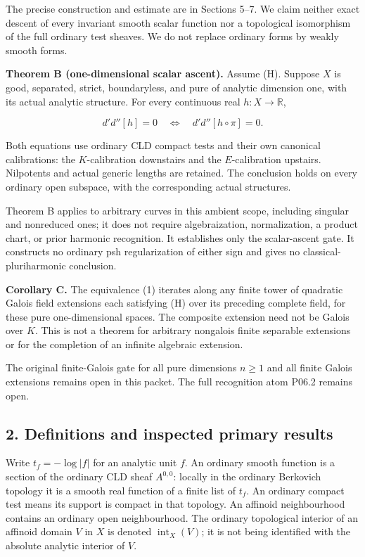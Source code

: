 \documentclass[
  11pt,
]{article}
\begin{document}
The precise construction and estimate are in Sections 5--7. We claim
neither exact descent of every invariant smooth scalar function nor a
topological isomorphism of the full ordinary test sheaves. We do not
replace ordinary forms by weakly smooth forms.

\textbf{Theorem B (one-dimensional scalar ascent).} Assume (H). Suppose
\(X\) is good, separated, strict, boundaryless, and pure of analytic
dimension one, with its actual analytic structure. For every continuous
real \(h:X\to\mathbb R\),

\[
d'd''[h]=0\quad\Longleftrightarrow\quad d'd''[h\circ\pi]=0. \tag{1}
\]

Both equations use ordinary CLD compact tests and their own canonical
calibrations: the \(K\)-calibration downstairs and the \(E\)-calibration
upstairs. Nilpotents and actual generic lengths are retained. The
conclusion holds on every ordinary open subspace, with the corresponding
actual structures.

Theorem B applies to arbitrary curves in this ambient scope, including
singular and nonreduced ones; it does not require algebraization,
normalization, a product chart, or prior harmonic recognition. It
establishes only the scalar-ascent gate. It constructs no ordinary psh
regularization of either sign and gives no classical-pluriharmonic
conclusion.

\textbf{Corollary C.} The equivalence (1) iterates along any finite
tower of quadratic Galois field extensions each satisfying (H) over its
preceding complete field, for these pure one-dimensional spaces. The
composite extension need not be Galois over \(K\). This is not a theorem
for arbitrary nongalois finite separable extensions or for the
completion of an infinite algebraic extension.

The original finite-Galois gate for all pure dimensions \(n\geq1\) and
all finite Galois extensions remains open in this packet. The full
recognition atom P06.2 remains open.

\subsection{2. Definitions and inspected primary
results}\label{definitions-and-inspected-primary-results}

Write \(t_f=-\log|f|\) for an analytic unit \(f\). An ordinary smooth
function is a section of the ordinary CLD sheaf \(A^{0,0}\): locally in
the ordinary Berkovich topology it is a smooth real function of a finite
list of \(t_f\). An ordinary compact test means its support is compact
in that topology. An affinoid neighbourhood contains an ordinary open
neighbourhood. The ordinary topological interior of an affinoid domain
\(V\) in \(X\) is denoted \(\operatorname{int}_X(V)\); it is not being
identified with the absolute analytic interior of \(V\).
\end{document}
